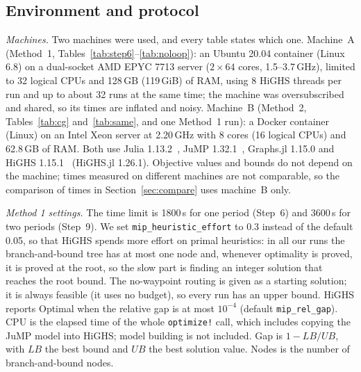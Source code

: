 \documentclass[conference]{IEEEtran}
\begin{document}
\subsection{Environment and protocol}\label{sec:env}
\emph{Machines.} Two machines were used, and every table states which one. Machine~A (Method~1, Tables~\ref{tab:step6}--\ref{tab:noloop}): an Ubuntu 20.04 container (Linux 6.8) on a dual-socket AMD EPYC 7713 server ($2\times64$ cores, 1.5--3.7\,GHz), limited to 32 logical CPUs and 128\,GB (119\,GiB) of RAM, using 8 HiGHS threads per run and up to about 32 runs at the same time; the machine was oversubscribed and shared, so its times are inflated and noisy. Machine~B (Method~2, Tables~\ref{tab:cg} and~\ref{tab:same}, and one Method~1 run): a Docker container (Linux) on an Intel Xeon server at 2.20\,GHz with 8 cores (16 logical CPUs) and 62.8\,GB of RAM. Both use Julia 1.13.2~\cite{julia}, JuMP 1.32.1~\cite{jump}, Graphs.jl 1.15.0 and HiGHS 1.15.1~\cite{highs} (HiGHS.jl 1.26.1). Objective values and bounds do not depend on the machine; times measured on different machines are not comparable, so the comparison of times in Section~\ref{sec:compare} uses machine~B only.

\emph{Method 1 settings.} The time limit is 1800\,s for one period (Step~6) and 3600\,s for two periods (Step~9). We set \texttt{mip\_heuristic\_effort} to 0.3 instead of the default 0.05, so that HiGHS spends more effort on primal heuristics: in all our runs the branch-and-bound tree has at most one node and, whenever optimality is proved, it is proved at the root, so the slow part is finding an integer solution that reaches the root bound. The no-waypoint routing is given as a starting solution; it is always feasible (it uses no budget), so every run has an upper bound. HiGHS reports Optimal when the relative gap is at most $10^{-4}$ (default \texttt{mip\_rel\_gap}). CPU is the elapsed time of the whole \texttt{optimize!} call, which includes copying the JuMP model into HiGHS; model building is not included. Gap is $1-LB/UB$, with $LB$ the best bound and $UB$ the best solution value. Nodes is the number of branch-and-bound nodes.
\end{document}
